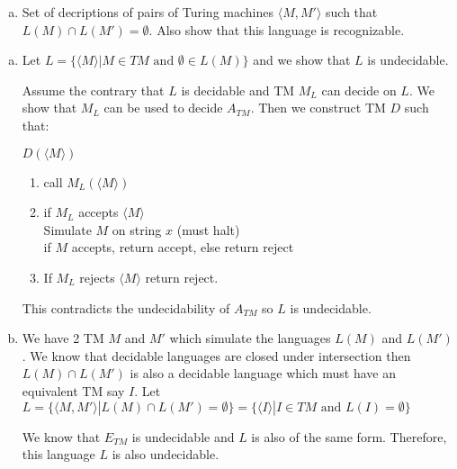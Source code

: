 \documentclass[12pt]{exam}
\begin{document}
\begin{questions}
\begin{enumerate}[a)]
    \item Set of decriptions of pairs of Turing machines $\langle M, M' \rangle$ such that $L(M)\cap L(M') = \emptyset$.
          Also show that this language is recognizable.

  \end{enumerate}


  \begin{solution}

    \begin{enumerate}[a)]
      \item Let $L=\{\langle M\rangle| M\in TM \text{ and } \emptyset \in L(M)\}$ and we show that $L$ is undecidable.

            Assume the contrary that $L$ is decidable and TM $M_{L}$ can decide on $L$. We show that $M_{L}$ can be used to decide $A_{TM}$. Then we construct TM $D$ such that:

            $D(\langle M\rangle)$
            \begin{enumerate}[1.]

              \item call $M_{L}(\langle M \rangle)$
              \item if $M_{L}$ accepts $\langle M \rangle$\\
                    \null\quad Simulate $M$ on string $x$ (must halt)\\
                    \null \quad if $M$ accepts, return accept, else return reject
              \item If $M_{L}$ rejects $\langle M\rangle$ return reject.
            \end{enumerate}

            This contradicts the undecidability of $A_{TM}$ so $L$ is undecidable.


      \item We have 2 TM $M$ and $M'$ which simulate the languages $L(M)$ and $L(M')$. We know that decidable languages are closed under intersection then $L(M)\cap L(M')$ is also a decidable language which must have an equivalent TM say $I$.
            Let $L=\{\langle M,M'\rangle| L(M)\cap L(M') = \emptyset\} = \{\langle I\rangle| I\in TM \text{ and } L(I) = \emptyset\}$

            We know that $E_{TM}$ is undecidable and $L$ is also of the same form. Therefore, this language $L$ is also undecidable.
    \end{enumerate}


  \end{solution}



\end{questions}
\end{document}
